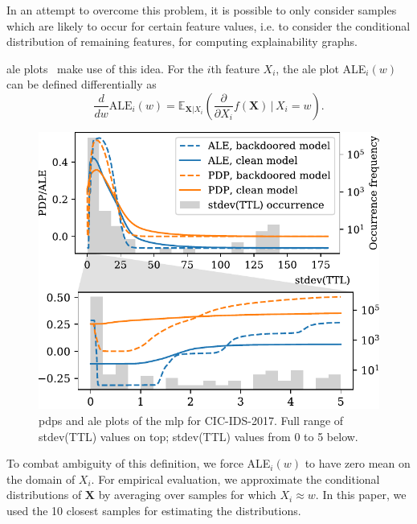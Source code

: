 \documentclass[9pt,sigconf,letterpaper,dvipsnames\ifx\removeHeaders\tempYes ,nonacm\fi]{acmart}
\newcommand\note[2]{{\color{#1}#2}}
\newcommand\todo[1]{{\note{red}{TODO: #1}}}
\newcommand{\cic}{CIC-IDS-2017}
\begin{document}
In an attempt to overcome this problem, it is possible to only consider samples which are likely to occur for certain feature values, i.e. to consider the conditional distribution of remaining features, for computing explainability graphs.

\gls{ale} plots~\cite{apley_visualizing_2016} make use of this idea.
For the $i$th feature $X_i$, the \gls{ale} plot ALE$_i(w)$ can be defined differentially as
\begin{equation}
\frac{d}{dw} \text{ALE}_i (w) = \mathbb E_{\boldsymbol X | X_i}\left(\frac{\partial}{\partial X_i} f(\boldsymbol X) \, \Big \vert \, X_i=w\right) .
\end{equation}


\begin{figure}[b!]
\includegraphics[width=\columnwidth]{figures/pdpale2017nn_joint_2.pdf}

\caption{\glspl{pdp} and \gls{ale} plots of the \gls{mlp} for \cic{}. Full range of stdev(TTL) values on top; stdev(TTL) values from 0 to 5 below.}
\label{fig:pdp_ttl}
\end{figure}


To combat ambiguity of this definition, we force ALE$_i(w)$ to have zero mean on the domain of $X_i$.
For empirical evaluation, we approximate the conditional distributions of $\boldsymbol X$ by averaging over samples for which $X_i \approx w$. In this paper, we used the 10  closest samples
for estimating the distributions.
\end{document}
